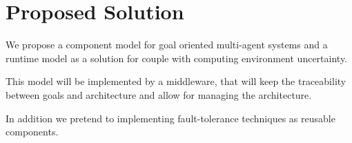 \section{Proposed Solution}

We propose a component model for goal oriented multi-agent systems and a runtime model as a solution for couple with computing environment uncertainty.

This model will be implemented by a middleware, that will keep the traceability between goals and architecture and allow for managing the architecture.

In addition we pretend to implementing fault-tolerance techniques as reusable components.
